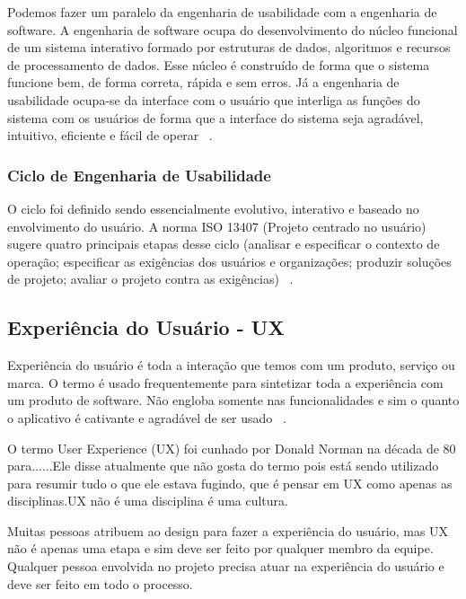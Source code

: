 Podemos fazer um paralelo da engenharia de usabilidade com a engenharia de software. A engenharia de software ocupa do desenvolvimento do núcleo funcional de um sistema interativo formado por estruturas de dados, algoritmos e recursos de processamento de dados. Esse núcleo é construído de forma que o sistema funcione bem, de forma correta, rápida e sem erros. Já a engenharia de usabilidade ocupa-se da interface com o usuário que interliga as funções do sistema com os usuários de forma que a interface do sistema seja agradável, intuitivo, eficiente e fácil de operar ~\cite{cybis2010}.



\subsubsection{Ciclo de Engenharia de Usabilidade}

	O ciclo foi definido sendo essencialmente evolutivo, interativo e baseado no envolvimento do usuário. A norma ISO 13407 (Projeto centrado no usuário) sugere quatro principais etapas desse ciclo (analisar e especificar o contexto de operação; especificar as exigências dos usuários e organizações; produzir soluções de projeto; avaliar o projeto contra as exigências) ~\cite{cybis2010}.


\subsection{Experiência do Usuário - UX}

	Experiência do usuário é toda a interação que temos com um produto, serviço ou marca. O termo é usado frequentemente para sintetizar toda a experiência com um produto de software. Não engloba  somente nas funcionalidades e sim o quanto o aplicativo é cativante e agradável de ser usado ~\cite{travis2013}.
	
	O termo User Experience (UX) foi cunhado por Donald Norman na década de 80 para......Ele disse atualmente que não gosta do termo pois está sendo utilizado para resumir tudo o que ele estava fugindo, que é pensar em UX como apenas as disciplinas.UX não é uma disciplina é uma cultura.

	Muitas pessoas atribuem ao design para fazer a experiência do usuário, mas UX não é apenas uma etapa e sim deve ser feito por qualquer membro da equipe. Qualquer pessoa envolvida no projeto precisa atuar na experiência do usuário e deve ser feito em todo o 
processo.
	
